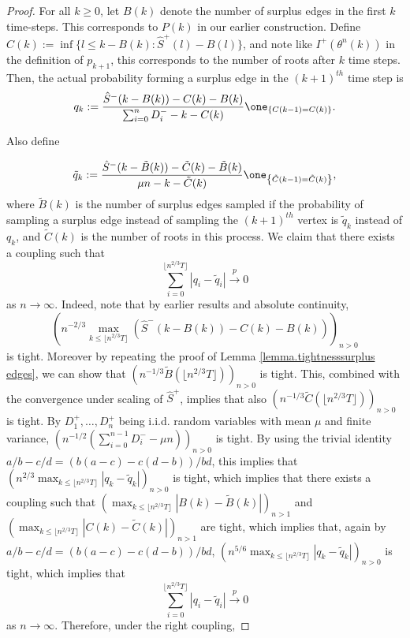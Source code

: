 \begin{proof}
For all $k\geq 0$, let $B(k)$ denote the number of surplus edges in the first $k$ time-steps. This corresponds to $P(k)$ in our earlier construction. Define $C(k):=\inf\{l\leq k-B(k) :  \hat{S}^+(l)-B(l)\}$, and note like $I^+(\theta^n(k))$ in the definition of $p_{k+1}$, this corresponds to the number of roots after $k$ time steps.  Then, the actual probability forming a surplus edge in the $(k+1)^{th}$ time step is
$$q_k:=\frac{\hat{S}^-(k-B(k))-C(k)-B(k)}{\sum_{i=0}^n D^-_i-k-C(k)}\one_{\left\{C(k-1)= C(k)\right\}}.$$

Also define 

$$\tilde{q}_k:=\frac{\hat{S}^-(k-\tilde{B}(k))-\tilde{C}(k)-\tilde{B}(k)}{\mu n-k-\tilde{C}(k)}\one_{\left\{\tilde{C}(k-1)=\tilde{C}(k)\right\}},$$
where $\tilde{B}(k)$ is the number of surplus edges sampled if the probability of sampling a surplus edge instead of sampling the $(k+1)^{th}$ vertex is $\tilde{q}_k$ instead of ${q}_k$, and $\tilde{C}(k)$ is the number of roots in this process.
We claim that there exists a coupling such that
$$\sum_{i=0}^{\lfloor n^{2/3}T\rfloor }|q_i-\tilde{q}_i|\overset{p}{\to}0$$
as $n\to \infty$. 
Indeed, note that by earlier results and absolute continuity, 
$$\left(n^{-2/3}\max_{k\leq \lfloor n^{2/3}T\rfloor}(\hat{S}^-(k-B(k))-C(k)-B(k))\right)_{n>0}$$ is tight. Moreover by repeating the proof of Lemma \ref{lemma.tightnesssurplus edges}, we can show that $\left(n^{-1/3}\tilde{B}\left(\lfloor n^{2/3}T\rfloor \right)\right)_{n>0}$ is tight. This, combined with the convergence under scaling of $\hat{S}^+$, implies that also $\left(n^{-1/3}\tilde{C}\left(\lfloor n^{2/3}T\rfloor \right)\right)_{n>0}$ is tight.  By $D^+_1,\dots,D^+_n$ being i.i.d. random variables with mean $\mu$ and finite variance,
$\left(n^{-1/2}\left(\sum_{i=0}^{n-1}D^-_i-\mu n\right)\right)_{n>0}$ is tight. By using the trivial identity $a/b-c/d=(b(a-c)-c(d-b))/bd$, this implies that
$\left(n^{2/3}\max_{k\leq \lfloor n^{2/3}T\rfloor }|q_k-\tilde{q}_k|\right)_{n>0}$ is tight, which implies that there exists a coupling such that $\left(\max_{k\leq \lfloor n^{2/3}T\rfloor } |B(k)-\tilde{B}(k)|\right)_{n>1}$ and $\left(\max_{k\leq \lfloor n^{2/3}T\rfloor } |C(k)-\tilde{C}(k)|\right)_{n>1}$ are tight, which implies that, again by $a/b-c/d=(b(a-c)-c(d-b))/bd$, 
$\left(n^{5/6}\max_{k\leq \lfloor n^{2/3}T\rfloor }|q_k-\tilde{q}_k|\right)_{n>0}$ is tight, which implies that 
$$\sum_{i=0}^{\lfloor n^{2/3}T\rfloor }|q_i-\tilde{q}_i|\overset{p}{\to}0$$
as $n\to \infty$. 
Therefore, under the right coupling, 

\end{proof}
